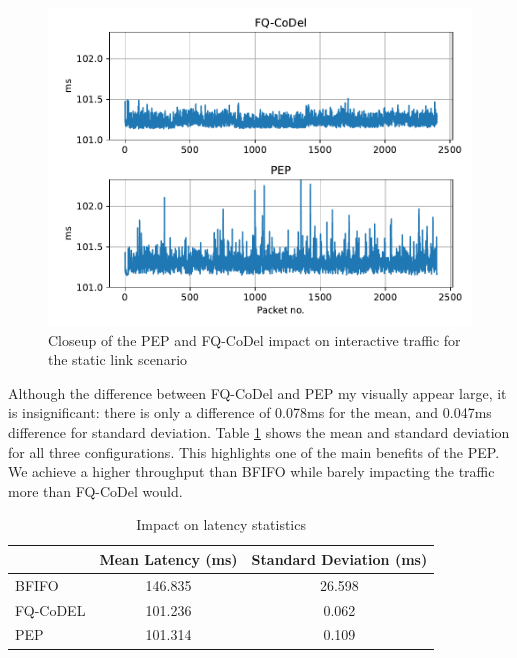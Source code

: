 \documentclass[a4paper,english, 11pt]{report}
\begin{document}
\begin{figure}[!h!] %
	\centering
	\includegraphics[scale=0.70]{../diagrams/witestlab/throughput/throughput_latency_closeup_sl.pdf}
  	\caption{Closeup of the PEP and FQ-CoDel impact on interactive traffic for the static link scenario}
  	\label{fig:throughput_latency_closeup_sl}
\end{figure}

Although the difference between FQ-CoDel and PEP my visually appear large, it is insignificant: there is only a difference of 0.078ms for the mean, and 0.047ms difference for standard deviation. Table \ref{tab:throughput_latency_stats_sl} shows the mean and standard deviation for all three configurations. This highlights one of the main benefits of the PEP. We achieve a higher throughput than BFIFO while barely impacting the traffic more than FQ-CoDel would.\\

\begin{table}[h!]
\centering
\begin{tabular}{l|c|c}
\hline
 & \textbf{Mean Latency (ms)} & \textbf{Standard Deviation (ms)} \\
\hline
BFIFO    & 146.835 & 26.598 \\
FQ-CoDEL  & 101.236 & 0.062 \\
PEP      & 101.314 & 0.109 \\
\hline
\end{tabular}
\caption{Impact on latency statistics}
\label{tab:throughput_latency_stats_sl}
\end{table}
\end{document}
